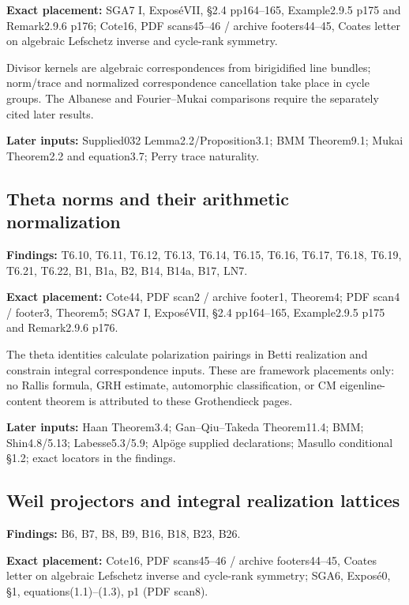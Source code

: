 \documentclass[11pt,a4paper]{article}
\theoremstyle{definition}
\begin{document}
\textbf{Exact placement:} SGA7 I, ExposéVII, §2.4 pp164--165,
Example2.9.5 p175 and Remark2.9.6 p176; Cote16, PDF scans45--46 /
archive footers44--45, Coates letter on algebraic Lefschetz inverse and
cycle-rank symmetry.

Divisor kernels are algebraic correspondences from birigidified line
bundles; norm/trace and normalized correspondence cancellation take
place in cycle groups. The Albanese and Fourier--Mukai comparisons
require the separately cited later results.

\textbf{Later inputs:} Supplied032 Lemma2.2/Proposition3.1; BMM
Theorem9.1; Mukai Theorem2.2 and equation3.7; Perry trace naturality.

\subsection{Theta norms and their arithmetic
normalization}\label{FRAMEWORK-theta-norms-and-their-arithmetic-normalization}

\textbf{Findings:} T6.10, T6.11, T6.12, T6.13, T6.14, T6.15, T6.16,
T6.17, T6.18, T6.19, T6.21, T6.22, B1, B1a, B2, B14, B14a, B17, LN7.

\textbf{Exact placement:} Cote44, PDF scan2 / archive footer1, Theorem4;
PDF scan4 / footer3, Theorem5; SGA7 I, ExposéVII, §2.4 pp164--165,
Example2.9.5 p175 and Remark2.9.6 p176.

The theta identities calculate polarization pairings in Betti
realization and constrain integral correspondence inputs. These are
framework placements only: no Rallis formula, GRH estimate, automorphic
classification, or CM eigenline-content theorem is attributed to these
Grothendieck pages.

\textbf{Later inputs:} Haan Theorem3.4; Gan--Qiu--Takeda Theorem11.4;
BMM; Shin4.8/5.13; Labesse5.3/5.9; Alpöge supplied declarations; Masullo
conditional §1.2; exact locators in the findings.

\subsection{Weil projectors and integral realization
lattices}\label{FRAMEWORK-weil-projectors-and-integral-realization-lattices}

\textbf{Findings:} B6, B7, B8, B9, B16, B18, B23, B26.

\textbf{Exact placement:} Cote16, PDF scans45--46 / archive
footers44--45, Coates letter on algebraic Lefschetz inverse and
cycle-rank symmetry; SGA6, Exposé0, §1, equations(1.1)--(1.3), p1 (PDF
scan8).
\end{document}

